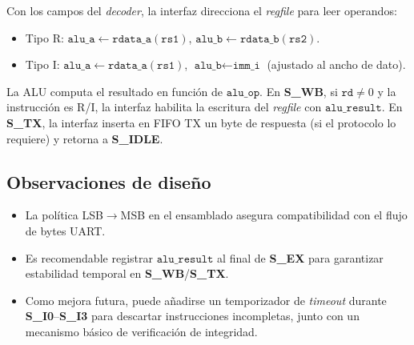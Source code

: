 Con los campos del \textit{decoder}, la interfaz direcciona el \textit{regfile} para leer operandos:
\begin{itemize}
  \item Tipo R: \(\texttt{alu\_a} \leftarrow \texttt{rdata\_a}(\texttt{rs1})\), \(\texttt{alu\_b} \leftarrow \texttt{rdata\_b}(\texttt{rs2})\).
  \item Tipo I: \(\texttt{alu\_a} \leftarrow \texttt{rdata\_a}(\texttt{rs1})\), \(\texttt{alu\_b} \leftarrow \texttt{imm\_i}\) (ajustado al ancho de dato).
\end{itemize}
La ALU computa el resultado en función de \(\texttt{alu\_op}\). En \textbf{S\_WB}, si \(\texttt{rd}\neq 0\) y la instrucción es R/I, la interfaz habilita la escritura del \textit{regfile} con \(\texttt{alu\_result}\). En \textbf{S\_TX}, la interfaz inserta en FIFO TX un byte de respuesta (si el protocolo lo requiere) y retorna a \textbf{S\_IDLE}.

\newpage

\subsection{Observaciones de diseño}

\begin{itemize}
  \item La política LSB\(\rightarrow\)MSB en el ensamblado asegura compatibilidad con el flujo de bytes UART.
  \item Es recomendable registrar \(\texttt{alu\_result}\) al final de \textbf{S\_EX} para garantizar estabilidad temporal en \textbf{S\_WB}/\textbf{S\_TX}.
  \item Como mejora futura, puede añadirse un temporizador de \emph{timeout} durante \textbf{S\_I0}--\textbf{S\_I3} para descartar instrucciones incompletas, junto con un mecanismo básico de verificación de integridad.
\end{itemize}

